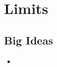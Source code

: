 \chapter{Limits}
\label{chap:L}

\section{Big Ideas}
\label{sec:L Big Ideas}
\begin{itemize}
  \item 
\end{itemize}